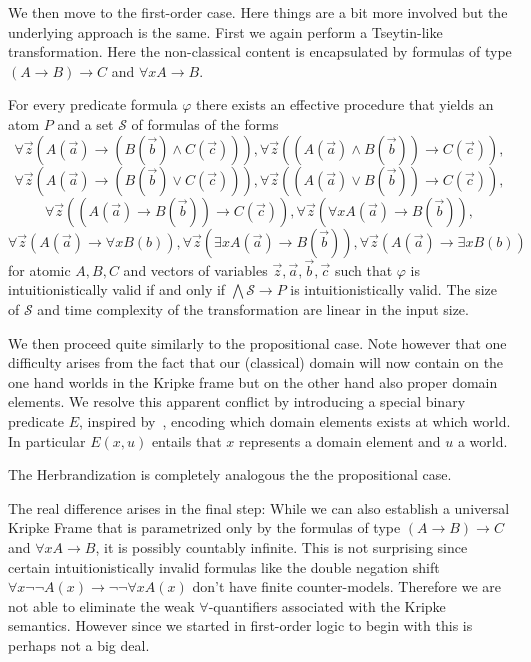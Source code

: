 \documentclass[a4paper,UKenglish,cleveref, autoref, thm-restate]{lipics-v2021}
\begin{document}
We then move to the first-order case. Here things are a bit more involved but the underlying approach is the same. First we again perform a Tseytin-like transformation. Here the non-classical content is encapsulated by formulas of type $(A\to B)\to C$ and $\forall xA\to B$.

\begin{theorem}
	For every predicate formula $\varphi$ there exists an effective procedure that yields an atom $P$ and a set $\mathcal S$ of formulas of the forms
	$$\forall \vec z(A(\vec a)\to (B(\vec b)\wedge C(\vec c))), \forall \vec z((A(\vec a)\wedge B(\vec b))\to C(\vec c)),$$$$\forall \vec z(A(\vec a)\to (B(\vec b)\vee C(\vec c))),
	\forall \vec z((A(\vec a)\vee B(\vec b))\to C(\vec c)),$$$$ \forall \vec z((A(\vec a)\to B(\vec b))\to C(\vec c)),\forall \vec z(\forall xA(\vec a)\to B(\vec b)),$$$$ \forall \vec z(A(\vec a)\to\forall xB(b)), \forall \vec z(\exists xA(\vec a)\to B(\vec b)), \forall \vec z(A(\vec a)\to\exists xB(b))$$for atomic $A, B, C$ and vectors of variables $\vec z, \vec a, \vec b, \vec c$ such that $\varphi$ is intuitionistically valid if and only if $\bigwedge\mathcal S\to P$ is intuitionistically valid. The size of $\mathcal S$ and time complexity of the transformation are linear in the input size.
\end{theorem}

We then proceed quite similarly to the propositional case. Note however that one difficulty arises from the fact that our (classical) domain will now contain on the one hand worlds in the Kripke frame but on the other hand also proper domain elements. We resolve this apparent conflict by introducing a special binary predicate $E$, inspired by~\cite{iemhoff2010eskolemization}, encoding which domain elements exists at which world. In particular $E(x, u)$ entails that $x$ represents a domain element and $u$ a world.

The Herbrandization is completely analogous the the propositional case.

The real difference arises in the final step: While we can also establish a universal Kripke Frame that is parametrized only by the formulas of type $(A\to B)\to C$ and $\forall xA\to B$, it is possibly countably infinite. This is not surprising since certain intuitionistically invalid formulas like the double negation shift $\forall x\neg\neg A(x)\to \neg\neg\forall x A(x)$ don't have finite counter-models. Therefore we are not able to eliminate the weak $\forall$-quantifiers associated with the Kripke semantics. However since we started in first-order logic to begin with this is perhaps not a big deal.
\end{document}
